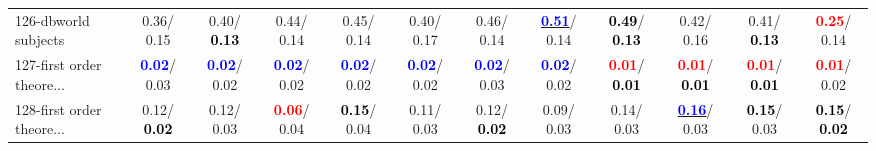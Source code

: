 \begin{table}[h]
\begin{center}
{\begin{tabular}{lc|c|c|c|c|c|c|c|c|c|c}
126-dbworld subjects &   0.36/  0.15 &   0.40/\textcolor{black}{\textbf{  0.13}} &   0.44/  0.14 &   0.45/  0.14 &   0.40/  0.17 &   0.46/  0.14 & \underline{\textcolor{blue}{\textbf{  0.51}}}/  0.14 & \textcolor{black}{\textbf{  0.49}}/\textcolor{black}{\textbf{  0.13}} &   0.42/  0.16 &   0.41/\textcolor{black}{\textbf{  0.13}} & \textcolor{red}{\textbf{  0.25}}/  0.14 \\
127-first order theore... & \textcolor{blue}{\textbf{  0.02}}/  0.03 & \textcolor{blue}{\textbf{  0.02}}/  0.02 & \textcolor{blue}{\textbf{  0.02}}/  0.02 & \textcolor{blue}{\textbf{  0.02}}/  0.02 & \textcolor{blue}{\textbf{  0.02}}/  0.02 & \textcolor{blue}{\textbf{  0.02}}/  0.03 & \textcolor{blue}{\textbf{  0.02}}/  0.02 & \textcolor{red}{\textbf{  0.01}}/\textcolor{black}{\textbf{  0.01}} & \textcolor{red}{\textbf{  0.01}}/\textcolor{black}{\textbf{  0.01}} & \textcolor{red}{\textbf{  0.01}}/\textcolor{black}{\textbf{  0.01}} & \textcolor{red}{\textbf{  0.01}}/  0.02 \\
128-first order theore... &   0.12/\textcolor{black}{\textbf{  0.02}} &   0.12/  0.03 & \textcolor{red}{\textbf{  0.06}}/  0.04 & \textcolor{black}{\textbf{  0.15}}/  0.04 &   0.11/  0.03 &   0.12/\textcolor{black}{\textbf{  0.02}} &   0.09/  0.03 &   0.14/  0.03 & \underline{\textcolor{blue}{\textbf{  0.16}}}/  0.03 & \textcolor{black}{\textbf{  0.15}}/  0.03 & \textcolor{black}{\textbf{  0.15}}/\textcolor{black}{\textbf{  0.02}} \\\end{tabular}}\label{stratsALCKappa3AllReduxHalfa}
\end{center}
\end{table}
